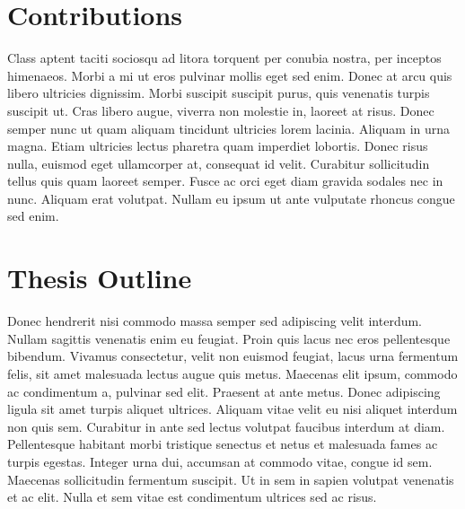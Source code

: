 \section{Contributions}

Class aptent taciti sociosqu ad litora torquent per conubia nostra, per inceptos himenaeos. Morbi a mi ut eros pulvinar mollis eget sed enim. Donec at arcu quis libero ultricies dignissim. Morbi suscipit suscipit purus, quis venenatis turpis suscipit ut. Cras libero augue, viverra non molestie in, laoreet at risus. Donec semper nunc ut quam aliquam tincidunt ultricies lorem lacinia. Aliquam in urna magna. Etiam ultricies lectus pharetra quam imperdiet lobortis. Donec risus nulla, euismod eget ullamcorper at, consequat id velit. Curabitur sollicitudin tellus quis quam laoreet semper. Fusce ac orci eget diam gravida sodales nec in nunc. Aliquam erat volutpat. Nullam eu ipsum ut ante vulputate rhoncus congue sed enim.

\section{Thesis Outline}

Donec hendrerit nisi commodo massa semper sed adipiscing velit interdum. Nullam sagittis venenatis enim eu feugiat. Proin quis lacus nec eros pellentesque bibendum. Vivamus consectetur, velit non euismod feugiat, lacus urna fermentum felis, sit amet malesuada lectus augue quis metus. Maecenas elit ipsum, commodo ac condimentum a, pulvinar sed elit. Praesent at ante metus. Donec adipiscing ligula sit amet turpis aliquet ultrices. Aliquam vitae velit eu nisi aliquet interdum non quis sem. Curabitur in ante sed lectus volutpat faucibus interdum at diam. Pellentesque habitant morbi tristique senectus et netus et malesuada fames ac turpis egestas. Integer urna dui, accumsan at commodo vitae, congue id sem. Maecenas sollicitudin fermentum suscipit. Ut in sem in sapien volutpat venenatis et ac elit. Nulla et sem vitae est condimentum ultrices sed ac risus.